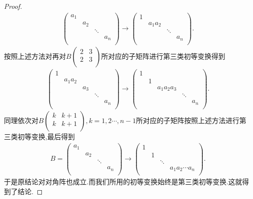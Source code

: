 \documentclass[../../main.tex]{subfiles}%
\begin{document}
\begin{proof}
\begin{align*}
\left( \begin{matrix}
a_1&		&		&		\\
&		a_2&		&		\\
&		&		\ddots&		\\
&		&		&		a_n\\
\end{matrix} \right) \longrightarrow \left( \begin{matrix}
1&		&		&		\\
&		a_1a_2&		&		\\
&		&		\ddots&		\\
&		&		&		a_n\\
\end{matrix} \right) .
\end{align*}
按照上述方法对再对$B\left( \begin{matrix}
2&		3\\
2&		3\\
\end{matrix} \right) $所对应的子矩阵进行第三类初等变换得到
\begin{align*}
\left( \begin{matrix}
1&		&		&		&		\\
&		a_1a_2&		&		&		\\
&		&		a_3&		&		\\
&		&		&		\ddots&		\\
&		&		&		&		a_n\\
\end{matrix} \right) \longrightarrow \left( \begin{matrix}
1&		&		&		&		\\
&		1&		&		&		\\
&		&		a_1a_2a_3&		&		\\
&		&		&		\ddots&		\\
&		&		&		&		a_n\\
\end{matrix} \right) .
\end{align*}
同理依次对$B\left( \begin{matrix}
k&		k+1\\
k&		k+1\\
\end{matrix} \right),k=1,2\cdots,n-1$所对应的子矩阵按照上述方法进行第三类初等变换,最后得到
\begin{align*}
B=\left( \begin{matrix}
a_1&		&		&		\\
&		a_2&		&		\\
&		&		\ddots&		\\
&		&		&		a_n\\
\end{matrix} \right) \longrightarrow \left( \begin{matrix}
1&		&		&		\\
&		1&		&		\\
&		&		\ddots&		\\
&		&		&		a_1a_2\cdots a_n\\
\end{matrix} \right) .
\end{align*}
于是原结论对对角阵也成立.而我们所用的初等变换始终是第三类初等变换.这就得到了结论.
\end{proof}
\end{document}

